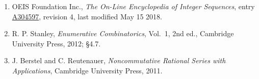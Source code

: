 \documentclass[11pt]{article}
\theoremstyle{definition}
\begin{document}
\begin{enumerate}

\item OEIS Foundation Inc., \emph{The On-Line Encyclopedia of Integer Sequences}, entry \href{https://oeis.org/A304597}{A304597}, revision 4, last modified May 15 2018.

\item R. P. Stanley, \emph{Enumerative Combinatorics}, Vol.~1, 2nd ed., Cambridge University Press, 2012; \S4.7.

\item J. Berstel and C. Reutenauer, \emph{Noncommutative Rational Series with Applications}, Cambridge University Press, 2011.

\end{enumerate}
\end{document}
